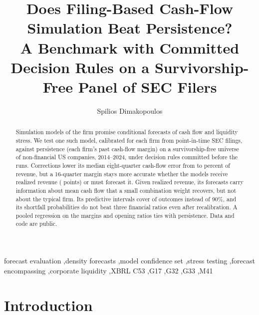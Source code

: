 \documentclass[preprint,12pt,authoryear]{elsarticle}
\newif\ifanon\anonfalse
\begin{document}
\begin{frontmatter}
\title{Does Filing-Based Cash-Flow Simulation Beat Persistence?\\A Benchmark with Committed Decision Rules on a Survivorship-Free Panel of SEC Filers}
\ifanon\else
\author{Spilios Dimakopoulos}
\address{Independent researcher, Athens, Greece}
\fi

\begin{abstract}
\noindent Simulation models of the firm promise conditional forecasts of cash flow and liquidity stress. We test one such model, calibrated for each firm from point-in-time SEC filings, against persistence (each firm's past cash-flow margin) on a survivorship-free universe of \UniverseN{} non-financial US companies, 2014--2024, under decision rules committed before the runs. Corrections lower its median eight-quarter cash-flow error from \SOneMedVtwoR{} to \SOneMedVthreeR{} percent of revenue, but a 16-quarter margin stays more accurate whether the models receive realized revenue (\TrMaeNthree{} points) or must forecast it. Given realized revenue, its forecasts carry information about mean cash flow that a small combination weight recovers, but not about the typical firm. Its predictive intervals cover \DenCov{} of outcomes instead of 90\%, and its shortfall probabilities do not beat three financial ratios even after recalibration. A pooled regression on the margins and opening ratios ties with persistence. Data and code are public.
\end{abstract}

\begin{keyword}
forecast evaluation \sep density forecasts \sep model confidence set \sep stress testing \sep forecast encompassing \sep corporate liquidity \sep XBRL
\JEL C53 \sep G17 \sep G32 \sep G33 \sep M41
\end{keyword}
\end{frontmatter}

\section{Introduction}\label{sec:intro}
\end{document}
